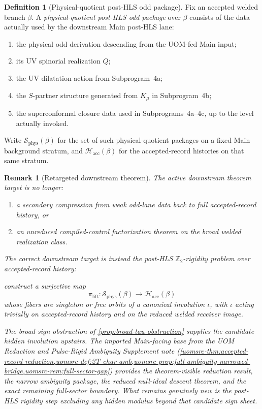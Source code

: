 \documentclass[11pt]{article}
\newtheorem{remark}[theorem]{Remark}
\theoremstyle{definition}
\newtheorem{definition}[theorem]{Definition}
\newcommand{\Hacc}{\mathcal H_{\mathrm{acc}}}
\newcommand{\SPhys}{\mathcal S_{\mathrm{phys}}}
\begin{document}
\begin{definition}[Physical-quotient post-HLS odd package]
\label{def:post-hls-package}
Fix an accepted welded branch \(\beta\).
A \emph{physical-quotient post-HLS odd package} over \(\beta\) consists of the data actually used by
the downstream Main post-HLS lane:
\begin{enumerate}[leftmargin=2em,label=(Z\arabic*)]
\item the physical odd derivation descending from the UOM-fed Main input;
\item its UV spinorial realization \(Q\);
\item the UV dilatation action from Subprogram~4a;
\item the \(S\)-partner structure generated from \(K_\mu\) in Subprogram~4b;
\item the superconformal closure data used in Subprograms~4a--4c, up to the level actually invoked.
\end{enumerate}
Write \(\SPhys(\beta)\) for the set of such physical-quotient packages on a fixed Main background
stratum, and \(\Hacc(\beta)\) for the accepted-record histories on that same stratum.
\end{definition}

\begin{remark}[Retargeted downstream theorem]
\label{rem:z2-lift-target}
The active downstream theorem target is no longer:
\begin{enumerate}[leftmargin=2em]
\item a secondary compression from weak odd-lane data back to full accepted-record history, or
\item an unreduced compiled-control factorization theorem on the broad welded realization class.
\end{enumerate}
The correct downstream target is instead the post-HLS \(\mathbb Z_2\)-rigidity problem over
accepted-record history:

\medskip
\noindent\emph{construct a surjective map}
\[
\pi_{\mathrm{lift}}:\SPhys(\beta)\to\Hacc(\beta)
\]
\emph{whose fibers are singleton or free orbits of a canonical involution \(\iota\), with}
\(\iota\) \emph{acting trivially on accepted-record history and on the reduced welded receiver image.}
\medskip

The broad sign obstruction of \cref{prop:broad-tau-obstruction} supplies the candidate hidden
involution upstairs.
The imported Main-facing base from the UOM Reduction and Pulse-Rigid Ambiguity Supplement note
\textup{(\cref{uomsrc-thm:accepted-record-reduction,uomsrc-def:2T-char-amb,uomsrc-prop:full-ambiguity-narrowed-bridge,uomsrc-rem:full-sector-gap})}
provides the theorem-visible reduction result, the narrow ambiguity package, the reduced null-ideal
descent theorem, and the exact remaining full-sector boundary.
What remains genuinely new is the post-HLS rigidity step excluding any hidden modulus beyond that
candidate sign sheet.
\end{remark}
\end{document}
